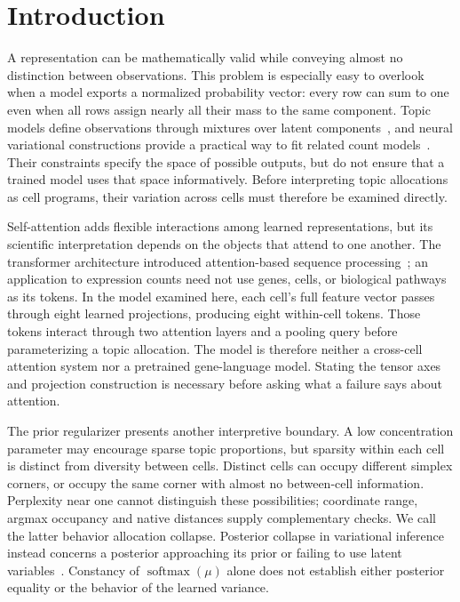 \section{Introduction}
A representation can be mathematically valid while conveying almost no distinction between observations. This problem is especially easy to overlook when a model exports a normalized probability vector: every row can sum to one even when all rows assign nearly all their mass to the same component. Topic models define observations through mixtures over latent components~\cite{blei2003latent}, and neural variational constructions provide a practical way to fit related count models~\cite{srivastava2017autoencoding}. Their constraints specify the space of possible outputs, but do not ensure that a trained model uses that space informatively. Before interpreting topic allocations as cell programs, their variation across cells must therefore be examined directly.

Self-attention adds flexible interactions among learned representations, but its scientific interpretation depends on the objects that attend to one another. The transformer architecture introduced attention-based sequence processing~\cite{vaswani2017attention}; an application to expression counts need not use genes, cells, or biological pathways as its tokens. In the model examined here, each cell's full feature vector passes through eight learned projections, producing eight within-cell tokens. Those tokens interact through two attention layers and a pooling query before parameterizing a topic allocation. The model is therefore neither a cross-cell attention system nor a pretrained gene-language model. Stating the tensor axes and projection construction is necessary before asking what a failure says about attention.

The prior regularizer presents another interpretive boundary. A low concentration parameter may encourage sparse topic proportions, but sparsity within each cell is distinct from diversity between cells. Distinct cells can occupy different simplex corners, or occupy the same corner with almost no between-cell information. Perplexity near one cannot distinguish these possibilities; coordinate range, argmax occupancy and native distances supply complementary checks. We call the latter behavior allocation collapse. Posterior collapse in variational inference instead concerns a posterior approaching its prior or failing to use latent variables~\cite{lucas2019collapse}. Constancy of $\operatorname{softmax}(\mu)$ alone does not establish either posterior equality or the behavior of the learned variance.

